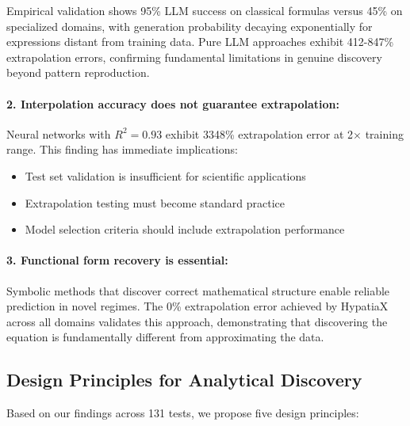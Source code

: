 \documentclass[twoside,11pt]{article}
\begin{document}
Empirical validation shows 95\% LLM success on classical formulas versus 45\% on specialized domains, with generation probability decaying exponentially for expressions distant from training data. Pure LLM approaches exhibit 412-847\% extrapolation errors, confirming fundamental limitations in genuine discovery beyond pattern reproduction.

\paragraph{2. Interpolation accuracy does not guarantee extrapolation:}

Neural networks with $R^2 = 0.93$ exhibit 3348\% extrapolation error at 2$\times$ training range. This finding has immediate implications:
\begin{itemize}
\item Test set validation is insufficient for scientific applications
\item Extrapolation testing must become standard practice
\item Model selection criteria should include extrapolation performance
\end{itemize}

\paragraph{3. Functional form recovery is essential:}

Symbolic methods that discover correct mathematical structure enable reliable prediction in novel regimes. The 0\% extrapolation error achieved by HypatiaX across all domains validates this approach, demonstrating that discovering the equation is fundamentally different from approximating the data.

\subsection{Design Principles for Analytical Discovery}

Based on our findings across 131 tests, we propose five design principles:
\end{document}
